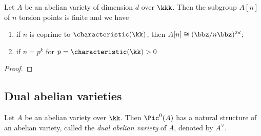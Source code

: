     \begin{theorem}\label{thm: torsion subgroups of abelian varieties}
        Let \(A\) be an abelian variety of dimension \(d\) over \(\kkk\). 
        Then the subgroup \(A[n]\) of \(n\) torsion points is finite and we have 
        \begin{enumerate}
            \item if \(n\) is coprime to \(\characteristic(\kk)\), then \(A[n] \cong (\bbz/n\bbz)^{2d}\);
            \item if \(n = p^k\) for \(p = \characteristic(\kk) > 0\)
        \end{enumerate}
    \end{theorem}
    \begin{proof}
    \end{proof}


\subsection{Dual abelian varieties}

    \begin{theorem}\label{thm: dual abelian varieties}
        Let $A$ be an abelian variety over $\kk$. 
        Then \(\Pic^0(A) \) has a natural structure of an abelian variety, called the \emph{dual abelian variety} of $A$, denoted by $A^\vee$.
    \end{theorem}

    \begin{proposition}\label{prop: the Poincare line bundle}
        
    \end{proposition}